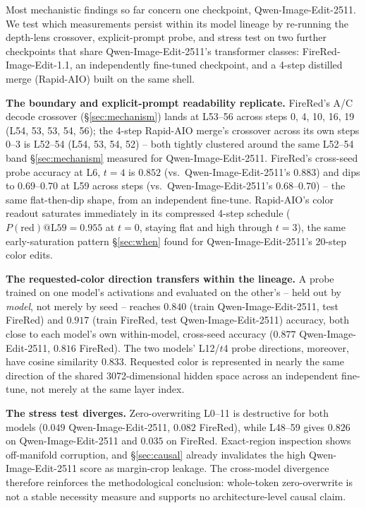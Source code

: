 \documentclass[10pt,twocolumn,letterpaper]{article}
\newcommand{\model}{Qwen-Image-Edit-2511}
\begin{document}
Most mechanistic findings so far concern one checkpoint, \model{}. We
test which measurements persist within its model lineage by re-running
the depth-lens crossover, explicit-prompt probe, and stress test on two further
checkpoints that share \model{}'s transformer classes: FireRed-Image-Edit-1.1,
an independently fine-tuned checkpoint, and a 4-step distilled merge
(Rapid-AIO) built on the same shell.

\textbf{The boundary and explicit-prompt readability replicate.} FireRed's
A/C decode crossover (\S\ref{sec:mechanism}) lands at L53--56 across steps
0, 4, 10, 16, 19 (L54, 53, 53, 54, 56); the 4-step Rapid-AIO merge's
crossover across its own steps 0--3 is L52--54 (L54, 53, 54, 52) -- both
tightly clustered around the same L52--54 band \S\ref{sec:mechanism}
measured for \model{}. FireRed's cross-seed probe accuracy at L6, $t{=}4$
is $0.852$ (vs.\ \model{}'s $0.883$) and dips to $0.69$--$0.70$ at L59
across steps (vs.\ \model{}'s $0.68$--$0.70$) -- the same flat-then-dip
shape, from an independent fine-tune. Rapid-AIO's color readout saturates
immediately in its compressed 4-step schedule ($P(\text{red})@\text{L59}
= 0.955$ at $t{=}0$, staying flat and high through $t{=}3$), the same
early-saturation pattern \S\ref{sec:when} found for \model{}'s 20-step
color edits.

\textbf{The requested-color direction transfers within the lineage.} A probe trained on one
model's activations and evaluated on the other's -- held out by
\emph{model}, not merely by seed -- reaches $0.840$ (train \model{}, test
FireRed) and $0.917$ (train FireRed, test \model{}) accuracy, both close
to each model's own within-model, cross-seed accuracy ($0.877$ \model{},
$0.816$ FireRed). The two models' L12/$t$4 probe directions, moreover,
have cosine similarity $0.833$. Requested color is represented in
nearly the same direction of the shared 3072-dimensional hidden space
across an independent fine-tune, not merely at the same layer index.

\textbf{The stress test diverges.} Zero-overwriting L0--11 is destructive
for both models ($0.049$ \model{}, $0.082$ FireRed), while L48--59 gives
$0.826$ on \model{} and $0.035$ on FireRed. Exact-region inspection shows
off-manifold corruption, and \S\ref{sec:causal} already invalidates the
high \model{} score as margin-crop leakage. The cross-model divergence
therefore reinforces the methodological conclusion: whole-token
zero-overwrite is not a stable necessity measure and supports no
architecture-level causal claim.
\end{document}
